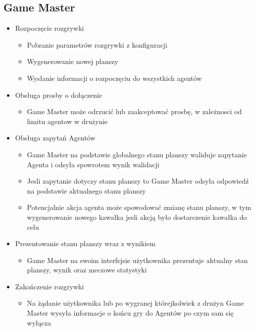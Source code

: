 \documentclass[../Dokumentacja.tex]{subfiles}
\begin{document}
\subsection{Game Master}
\begin{itemize}
	\item Rozpoczęcie rozgrywki
	\begin{itemize}
		\item Pobranie parametrów rozgrywki z konfiguracji
		\item Wygenerowanie nowej planszy
		\item Wysłanie informacji o rozpoczęciu do wszystkich agentów
	\end{itemize}
	\item Obsługa prosby o dołączenie
	\begin{itemize}
		\item Game Master może odrzucić lub zaakceptować prosbę, w zależnosci od limitu agentow w drużynie
	\end{itemize}
	\item Obsługa zapytań Agentów
	\begin{itemize}
		\item Game Master na podstawie globalnego stanu planszy waliduje zapytanie Agenta i odsyła spowrotem wynik walidacji
		\item Jesli zapytanie dotyczy stanu planszy to Game Master odsyła odpowiedź na podstawie aktualnego stanu planszy
		\item Potencjalnie akcja agenta może spowodować zmianę stanu planszy, w tym wygenerowanie nowego kawałka jesli akcją było dostarczenie kawałka do celu
	\end{itemize}
	\item Prezentowanie stanu planszy wraz z wynikiem
	\begin{itemize}
		\item Game Master na swoim interfejsie użytkownika prezentuje aktualny stan planszy, wynik oraz meczowe statystyki
	\end{itemize}
	\item Zakończenie rozgrywki
	\begin{itemize}
		\item Na żądanie użytkownika lub po wygranej którejkolwiek z drużyn Game Master wysyła informacje o końcu gry do Agentów po czym sam się wyłącza
	\end{itemize}
\end{itemize}
\end{document}
